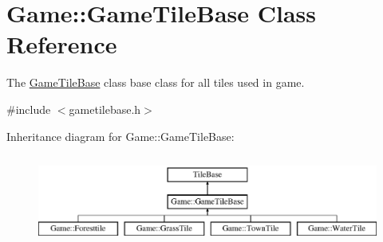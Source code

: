 \hypertarget{class_game_1_1_game_tile_base}{\section{Game\-:\-:Game\-Tile\-Base Class Reference}
\label{class_game_1_1_game_tile_base}
}


The \hyperlink{class_game_1_1_game_tile_base}{Game\-Tile\-Base} class base class for all tiles used in game.  




{\ttfamily \#include $<$gametilebase.\-h$>$}

Inheritance diagram for Game\-:\-:Game\-Tile\-Base\-:\begin{figure}[H]
\begin{center}
\leavevmode
\includegraphics[height=3.000000cm]{class_game_1_1_game_tile_base}
\end{center}
\end{figure}
